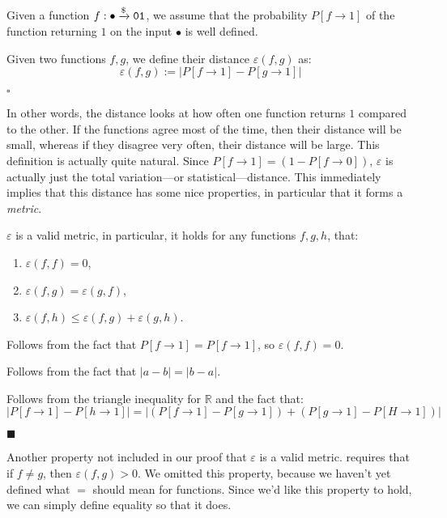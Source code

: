 \begin{definition}
    Given a function $f : \bullet \xrightarrow{\$} \texttt{01}$, we assume that the probability
    $P[f \to 1]$ of the function returning $1$ on the input $\bullet$ is well defined.

    Given two functions $f, g$, we define their distance $\varepsilon(f, g)$ as:
    $$
    \varepsilon(f, g) := |P[f \to 1] - P[g \to 1]|
    $$

    $\square$
\end{definition}

In other words, the distance looks at how often one function returns $1$
compared to the other.
If the functions agree most of the time, then their distance will be small,
whereas if they disagree very often, their distance will be large.
This definition is actually quite natural.
Since $P[f \to 1] = (1 - P[f \to 0])$, $\varepsilon$ is actually
just the total variation---or statistical---distance.
This immediately implies that this distance has some nice properties,
in particular that it forms a \emph{metric}.

\begin{lemma}
    $\varepsilon$ is a valid metric, in particular, it holds
    for any functions $f, g, h$, that:
    \begin{enumerate}
        \item $\varepsilon(f, f) = 0$,
        \item $\varepsilon(f, g) = \varepsilon(g, f)$,
        \item $\varepsilon(f, h) \leq \varepsilon(f, g) + \varepsilon(g, h)$.
    \end{enumerate}


     Follows from the fact that $P[f \to 1] = P[f \to 1]$,
    so $\varepsilon(f, f) = 0$.

     Follows from the fact that $|a - b| = |b - a|$.

     Follows from the triangle inequality for $\mathbb{R}$
    and the fact that:
    $$
    |P[f \to 1] - P[h \to 1]| = |(P[f \to 1] - P[g \to 1]) + (P[g \to 1] - P[H \to 1])|
    $$

    $\blacksquare$
\end{lemma}

Another property not included in our proof that $\varepsilon$ is a valid metric.
requires that if $f \neq g$, then $\varepsilon(f, g) > 0$.
We omitted this property, because we haven't yet defined what $=$
should mean for functions.
Since we'd like this property to hold, we can simply define
equality so that it does.

